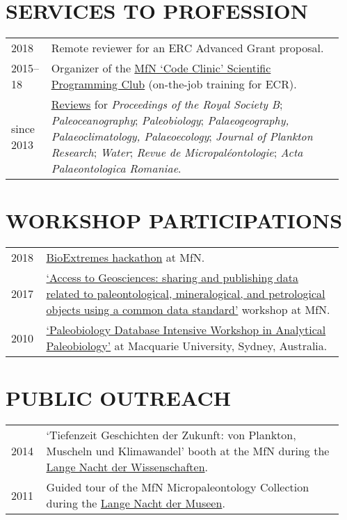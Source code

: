 \documentclass[11pt, a4paper]{article}
\begin{document}
\section{SERVICES TO PROFESSION}
\begin{longtable}{p{0.1\linewidth} P{0.85\linewidth}}
2018 & Remote reviewer for an ERC Advanced Grant proposal.\\
2015--18 & Organizer of the \href{https://github.com/plannapus/MfN-Code-Clinic}{MfN `Code Clinic' Scientific Programming Club} (on-the-job training for ECR). \\
since 2013 & \href{http://publons.com/a/1291154/}{Reviews} for \textit{Proceedings of the Royal Society B}; \textit{Paleoceanography}; \textit{Paleobiology}; \textit{Palaeogeography, Palaeoclimatology, Palaeoecology}; \textit{Journal of Plankton Research}; \textit{Water}; \textit{Revue de Micropal\'{e}ontologie}; \textit{Acta Palaeontologica Romaniae}. \\
\end{longtable}

\section{WORKSHOP PARTICIPATIONS}
\begin{longtable}{p{0.1\linewidth} P{0.85\linewidth}}
2018 & \href{https://github.com/macroecology/BioExtremes}{BioExtremes hackathon} at MfN.\\
2017 & \href{https://abcd.biowikifarm.net/wiki/Events:WorkshopEFG2017}{`Access to Geosciences: sharing and publishing data related to paleontological, mineralogical, and petrological objects using a common data standard'} workshop at MfN.\\
2010 & \href{http://fossilworks.org/?page=workshop}{`Paleobiology Database Intensive Workshop in Analytical Paleobiology'} at Macquarie University, Sydney, Australia.\\
\end{longtable}

\section{PUBLIC OUTREACH}
\begin{longtable}{p{0.1\linewidth} P{0.85\linewidth}}
2014 & `Tiefenzeit Geschichten der Zukunft: von Plankton, Muscheln und Klimawandel' booth at the MfN during the \href{http://www.langenachtderwissenschaften.de/}{Lange Nacht der Wissenschaften}.\\
2011 & Guided tour of the MfN Micropaleontology Collection during the \href{http://www.lange-nacht-der-museen.de/}{Lange Nacht der Museen}.\\
\end{longtable}
\end{document}
